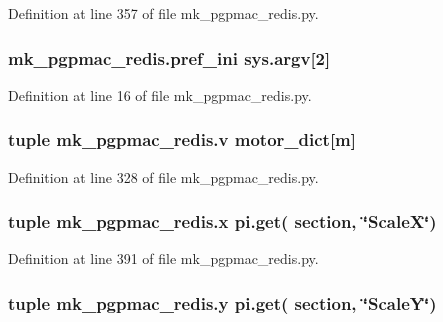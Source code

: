 Definition at line 357 of file mk\-\_\-pgpmac\-\_\-redis.\-py.

\hypertarget{namespacemk__pgpmac__redis_a38c785af5201403976e1267c47ea5096}{
\subsubsection[{pref\-\_\-ini}]{\setlength{\rightskip}{0pt plus 5cm}mk\-\_\-pgpmac\-\_\-redis.\-pref\-\_\-ini sys.\-argv\mbox{[}2\mbox{]}}}\label{namespacemk__pgpmac__redis_a38c785af5201403976e1267c47ea5096}


Definition at line 16 of file mk\-\_\-pgpmac\-\_\-redis.\-py.

\hypertarget{namespacemk__pgpmac__redis_ac732d49b0afca9a9951e3a252bae42fc}{
\subsubsection[{v}]{\setlength{\rightskip}{0pt plus 5cm}tuple mk\-\_\-pgpmac\-\_\-redis.\-v {\bf motor\-\_\-dict}\mbox{[}m\mbox{]}}}\label{namespacemk__pgpmac__redis_ac732d49b0afca9a9951e3a252bae42fc}


Definition at line 328 of file mk\-\_\-pgpmac\-\_\-redis.\-py.

\hypertarget{namespacemk__pgpmac__redis_abc8696f6f2f3fd3edd30989d3c8ec301}{
\subsubsection[{x}]{\setlength{\rightskip}{0pt plus 5cm}tuple mk\-\_\-pgpmac\-\_\-redis.\-x pi.\-get( section, \char`\"{}Scale\-X\char`\"{})}}\label{namespacemk__pgpmac__redis_abc8696f6f2f3fd3edd30989d3c8ec301}


Definition at line 391 of file mk\-\_\-pgpmac\-\_\-redis.\-py.

\hypertarget{namespacemk__pgpmac__redis_a34220d58136fb95853f54ed51a130f79}{
\subsubsection[{y}]{\setlength{\rightskip}{0pt plus 5cm}tuple mk\-\_\-pgpmac\-\_\-redis.\-y pi.\-get( section, \char`\"{}Scale\-Y\char`\"{})}}\label{namespacemk__pgpmac__redis_a34220d58136fb95853f54ed51a130f79}


